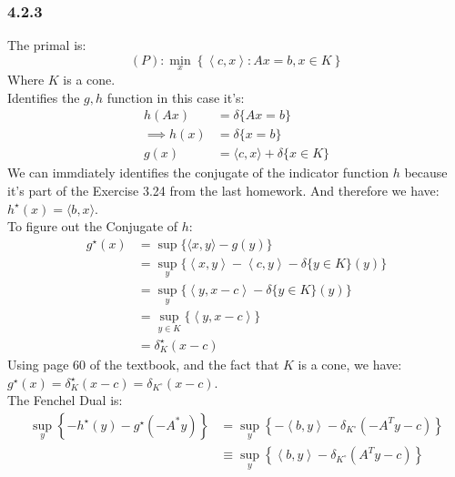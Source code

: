 \documentclass[]{article}
\begin{document}
    \subsubsection*{4.2.3}
        The primal is: 
        $$
            (P): \min_x\left\lbrace
                \left\langle c, x \right\rangle: Ax = b, x \in K
            \right\rbrace
        $$
        Where $K$ is a cone. 
        \\
        Identifies the $g, h$ function in this case it's: 
        \begin{align*}\tag{4.2.3.1}\label{eqn:4.2.3.1}
            h(Ax) &= \delta \{Ax = b \} 
            \\
            \implies h(x) &= \delta \{x = b\}
            \\
            g(x) &= \langle c, x\rangle + \delta \{x \in K\}
        \end{align*}
        We can immdiately identifies the conjugate of the indicator function $h$ because it's part of the Exercise 3.24 from the last homework. And therefore we have: $h^\star(x) = \langle b, x\rangle$. 
        \\
        To figure out the Conjugate of $h$: 
        \begin{align*}\tag{4.2.3.2}\label{eqn:4.2.3.2}
            g^\star(x) &= \sup \{\langle x, y \rangle - g(y)\}
            \\
            &= \sup_y \{
                \left\langle x, y \right\rangle - \left\langle c, y \right\rangle - \delta\{y \in K\}(y)
            \}
            \\
            &= \sup_y \{
                \left\langle y, x - c \right\rangle - \delta\{y \in K\}(y)
            \}
            \\
            &= \sup_{y\in K}\{\left\langle y, x- c \right\rangle\}
            \\
            &= \delta^\star_{K}(x - c)
        \end{align*}
        Using page 60 of the textbook, and the fact that $K$ is a cone, we have: $g^\star(x) = \delta^\star_K(x - c) = \delta_{K^\circ}(x - c)$. 
        \\
        The Fenchel Dual is: 
        \begin{align*}\tag{4.2.3.3}\label{eqn:4.2.3.3}
            \sup_{y} \left\lbrace
                - h^{\star}(y) - g^\star(- A^*y)
            \right\rbrace
            &= 
            \sup_{y} \left\lbrace
                - \left\langle b, y \right\rangle - \delta_{K^\circ} (-A^Ty - c)
            \right\rbrace
            \\
            &\equiv 
            \sup_{y} \left\lbrace
                \left\langle b, y \right\rangle - \delta_{K^\circ} (A^Ty - c)
            \right\rbrace
        \end{align*}
\end{document}
